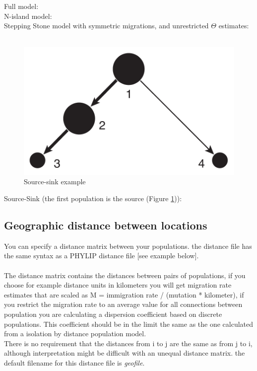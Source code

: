 Full model: {}\\
N-island model: {}\\
Stepping Stone model with symmetric migrations, 
and unrestricted $\Theta$ estimates:\\ {}\\
\begin{figure}[hbt]
\begin{center}
\includegraphics[scale=0.4]{mim/source_sink}
\end{center}
\caption{Source-sink example}\label{ss}
\end{figure}
Source-Sink (the first population is the source (Figure \ref{ss})):\\
{}

\subsection{Geographic distance between locations}
You can specify a distance matrix between your populations.
the distance file has the same syntax as a PHYLIP distance file [see example below].\\

{}\\
The distance matrix contains the distances between pairs of populations, if you choose
for example distance units in kilometers you will get migration rate estimates that are scaled
as M = immigration rate / (mutation * kilometer), if you restrict the migration rate to an average value
for all connections between population you are calculating a dispersion coefficient based on discrete
populations. This coefficient should be in the limit the same as the one calculated  from a isolation by distance population model.
\\ 
There is no requirement that the distances from i to j are the same as from j to i, although interpretation might be difficult with
an unequal distance matrix. the default filename for this distance file is \textsl{geofile}.

